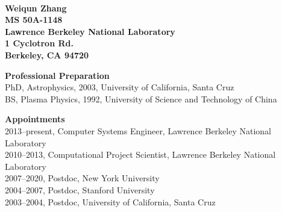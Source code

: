 \documentclass[11pt,letterpaper,english]{article}
\begin{document}
\setlength{\parindent}{0in} %




\\
{\bf Weiqun Zhang}\\
{\bf 
  MS 50A-1148\\
  Lawrence Berkeley National Laboratory\\
  1 Cyclotron Rd.\\
  Berkeley, CA 94720
} \smallskip

\begin{flushleft} {\bf Professional Preparation}
{\parindent 16pt\\
PhD, Astrophysics, 2003, University of California, Santa Cruz \\ 
BS, Plasma Physics, 1992, University of Science and Technology of China 
}

\vspace{.04in}
{\bf Appointments}
{\parindent 16pt\\
2013--present, Computer Systems Engineer, Lawrence Berkeley National Laboratory\\
2010--2013, Computational Project Scientist, Lawrence Berkeley National Laboratory\\ 
2007--2020, Postdoc, New York University \\
2004--2007, Postdoc, Stanford University \\ 
2003--2004, Postdoc, University of California, Santa Cruz
}


\end{flushleft}
\end{document}
